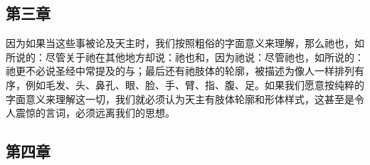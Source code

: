 
\subsection{第三章}

\par

因为如果当这些事被论及天主时，我们按照粗俗的字面意义来理解，那么祂也，如所说的：尽管关于祂在其他地方却说：祂也和，因为祂说：尽管祂也，如所说的：祂更不必说圣经中常提及的与；最后还有祂肢体的轮廓，被描述为像人一样排列有序，例如毛发、头、鼻孔、眼、脸、手、臂、指、腹、足。如果我们愿意按纯粹的字面意义来理解这一切，我们就必须认为天主有肢体轮廓和形体样式，这甚至是令人震惊的言词，必须远离我们的思想。\par


\subsection{第四章}

\par

